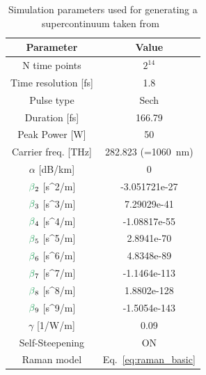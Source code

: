 \begin{table}[]
\centering
\begin{tabular}{cc}
\textbf{Parameter}                      & \textbf{Value}                                  \\ \hline
N time points                           & $2^{14}$                                          \\
Time resolution {[}fs{]}                & 1.8                                             \\\hline
Pulse type                              & Sech                                            \\
Duration {[}fs{]}                       & 166.79                                          \\
Peak Power {[}W{]}                      & 50                                              \\
Carrier freq. {[}THz{]}                 & 282.823 (=1060~nm)                         \\\hline
$\alpha$ {[}dB/km{]}                    & 0                                               \\
$\betag_2$ {[}s\textasciicircum{}2/m{]} & -3.051721e-27                                   \\
$\betag_3$ {[}s\textasciicircum{}3/m{]} & 7.29029e-41                                     \\
$\betag_4$ {[}s\textasciicircum{}4/m{]} & -1.08817e-55                                    \\
$\betag_5$ {[}s\textasciicircum{}5/m{]} & 2.8941e-70                                      \\
$\betag_6$ {[}s\textasciicircum{}6/m{]} & 4.8348e-89                                      \\
$\betag_7$ {[}s\textasciicircum{}7/m{]} & -1.1464e-113                                    \\
$\betag_8$ {[}s\textasciicircum{}8/m{]} & 1.8802e-128                                     \\
$\betag_9$ {[}s\textasciicircum{}9/m{]} & -1.5054e-143                                    \\
$\gamma$ {[}1/W/m{]}                    & 0.09                                            \\
Self-Steepening                         & ON                                              \\
Raman model                             & Eq.~\ref{eq:raman_basic}
\end{tabular}
\caption{Simulation parameters used for generating a supercontinuum taken from~\cite{supercontinuum_paper}}
\label{tab:SC_params}
\end{table}

